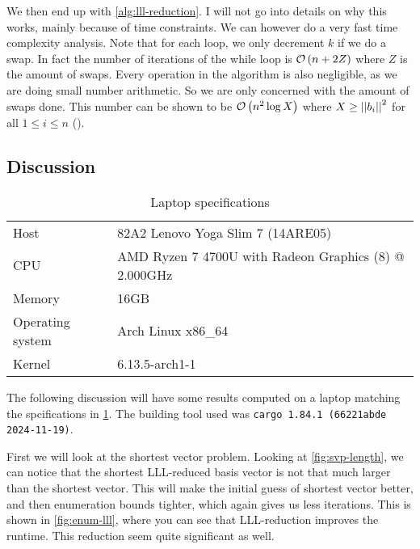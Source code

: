   We then end up with \cref{alg:lll-reduction}.
  I will not go into details on why this works, mainly because of time constraints.
  We can however do a very fast time complexity analysis.
  Note that for each loop, we only decrement $k$ if we do a swap.
  In fact the number of iterations of the while loop is $\mathcal{O} \left( n + 2Z \right)$ where $Z$ is the amount of swaps.
  Every operation in the algorithm is also negligible, as we are doing small number arithmetic.
  So we are only concerned with the amount of swaps done.
  This number can be shown to be $\mathcal{O} \left(  n^2 \log X  \right)$ where $X \geq \left|\left|  b_i  \right|\right|^2$ for all $1\leq i \leq n$ (\cite{galbraith}).
  

\subsection{Discussion}

  \begin{table}
    \begin{center}
      \begin{tabular}[c]{l|l}
        \hline
        Host & 82A2 Lenovo Yoga Slim 7 (14ARE05) \\
        CPU & AMD Ryzen 7 4700U with Radeon Graphics (8) @ 2.000GHz \\        
        Memory & 16GB \\
        Operating system & Arch Linux x86\_64 \\
        Kernel & 6.13.5-arch1-1 \\
        \hline
      \end{tabular}
    \end{center}
    \caption{Laptop specifications}\label{tab:specs}
  \end{table}

  The following discussion will have some results computed on a laptop matching the spcifications in \cref{tab:specs}.
  The building tool used was \texttt{cargo 1.84.1 (66221abde 2024-11-19)}.

  First we will look at the shortest vector problem.
  Looking at \cref{fig:svp-length}, we can notice that the shortest LLL-reduced basis vector is not that much larger than the shortest vector.
  This will make the initial guess of shortest vector better, and then enumeration bounds tighter, which again gives us less iterations.
  This is shown in \cref{fig:enum-lll}, where you can see that LLL-reduction improves the runtime.
  This reduction seem quite significant as well.

